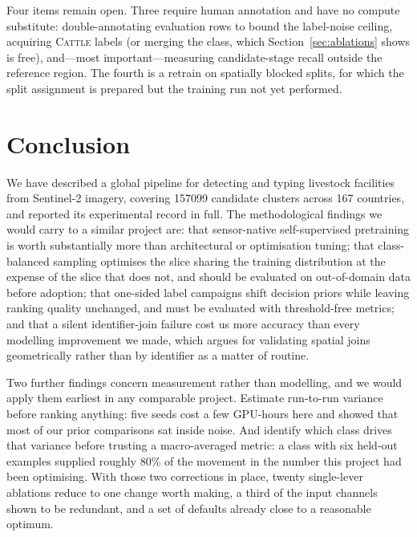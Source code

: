 \documentclass[11pt,a4paper]{article}
\begin{document}
Four items remain open. Three require human annotation and have no compute
substitute: double-annotating evaluation rows to bound the label-noise ceiling,
acquiring \textsc{Cattle} labels (or merging the class, which
Section~\ref{sec:ablations} shows is free), and---most important---measuring
candidate-stage recall outside the reference region. The fourth is a retrain on
spatially blocked splits, for which the split assignment is prepared but the
training run not yet performed.

\section{Conclusion}

We have described a global pipeline for detecting and typing livestock
facilities from Sentinel-2 imagery, covering \num{157099} candidate clusters
across 167 countries, and reported its experimental record in full. The
methodological findings we would carry to a similar project are: that
sensor-native self-supervised pretraining is worth substantially more than
architectural or optimisation tuning; that class-balanced sampling optimises the
slice sharing the training distribution at the expense of the slice that does
not, and should be evaluated on out-of-domain data before adoption; that
one-sided label campaigns shift decision priors while leaving ranking quality
unchanged, and must be evaluated with threshold-free metrics; and that a silent
identifier-join failure cost us more accuracy than every modelling improvement
we made, which argues for validating spatial joins geometrically rather than by
identifier as a matter of routine.

Two further findings concern measurement rather than modelling, and we would
apply them earliest in any comparable project. Estimate run-to-run variance
before ranking anything: five seeds cost a few GPU-hours here and showed that
most of our prior comparisons sat inside noise. And identify which class drives
that variance before trusting a macro-averaged metric: a class with six held-out
examples supplied roughly 80\% of the movement in the number this project had
been optimising. With those two corrections in place, twenty single-lever
ablations reduce to one change worth making, a third of the input channels shown
to be redundant, and a set of defaults already close to a reasonable optimum.
\end{document}
